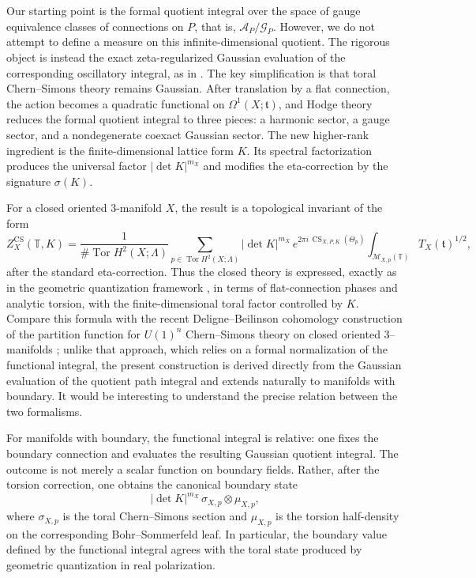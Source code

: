\documentclass[12pt]{amsart}
\numberwithin{equation}{section}
\newcommand{\CS}{\operatorname{CS}}
\newcommand{\Tor}{\operatorname{Tor}}
\begin{document}
Our starting point is the formal quotient integral over the space of gauge equivalence classes of connections on
$P$, that is, $\mathcal A_P/\mathcal G_P$. However, we do not attempt to define a  measure on this infinite-dimensional quotient. The rigorous object is instead the exact
zeta-regularized Gaussian evaluation of the corresponding oscillatory integral, as in \cite{Schwarz:1978cn}. The key simplification is that toral Chern--Simons theory remains Gaussian. After translation
by a flat  connection, the action becomes a quadratic functional on
$\Omega^1(X;\mathfrak t)$, and Hodge theory reduces the formal quotient integral to three
pieces: a harmonic sector, a gauge sector, and a nondegenerate coexact Gaussian sector.
The new higher-rank ingredient is the finite-dimensional lattice form $K$. Its spectral
factorization produces the universal factor $|\det K|^{m_X}$ and modifies the eta-correction
by the signature $\sigma(K)$.

For a closed oriented $3$-manifold $X$, the result is a topological invariant of the form
\[
Z^{\mathrm{CS}}_X(\mathbb T,K)
=
\frac{1}{\#\Tor H^2(X;\Lambda)}
\sum_{p\in \Tor H^2(X;\Lambda)}
|\det K|^{m_X}\,
e^{2\pi i\,\CS_{X,P,K}(\Theta_p)}
\int_{\mathcal M_{X,p}(\mathbb T)}
T_X(\mathfrak t)^{1/2},
\]
after the standard eta-correction. Thus the closed theory is expressed, exactly as in the geometric quantization framework \cite{Galviz2}, in terms of flat-connection phases and analytic torsion, with the finite-dimensional toral factor controlled by $K$. Compare this formula with the recent Deligne–Beilinson cohomology construction of the partition function for  $U(1)^n$ Chern–Simons theory on closed oriented 3--manifolds \cite{Kim2024}; unlike that approach, which relies on a formal normalization of the functional integral, the present construction is derived directly from the Gaussian evaluation of the quotient path integral and extends naturally to manifolds with boundary. It would be interesting to understand the precise relation between the two formalisms.


For manifolds with  boundary, the functional integral is relative: one fixes the
boundary connection and evaluates the resulting Gaussian quotient integral. The outcome is
not merely a scalar function on boundary fields. Rather, after the torsion correction, one
obtains the canonical boundary state
\[
|\det K|^{m_X}\,\sigma_{X,p}\otimes \mu_{X,p},
\]
where $\sigma_{X,p}$ is the toral Chern--Simons section and $\mu_{X,p}$ is the torsion
half-density on the corresponding Bohr--Sommerfeld leaf. In particular, the boundary value
defined by the functional integral agrees with the toral state produced by geometric
quantization in real polarization.
\end{document}
